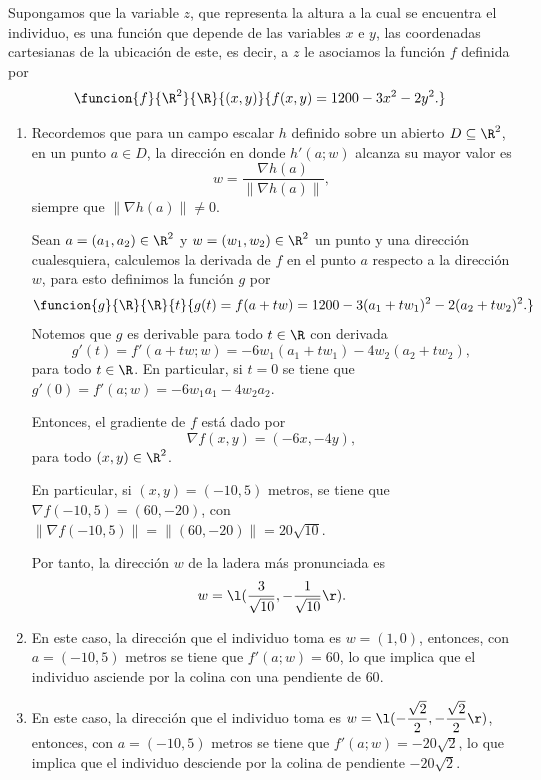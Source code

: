\documentclass[a4,11pt]{aleph-examen}
\begin{document}
\begin{preguntas}
\begin{respuesta}
\begin{respuesta}
\begin{respuesta}
    Supongamos que la variable $z$, que representa la altura a la cual se encuentra el individuo, es una función que depende de las variables $x$ e $y$, las coordenadas cartesianas de la ubicación de este, es decir, a $z$ le asociamos la función $f$ definida por
    \[
        \funcion{f}{\R^2}{\R}
        {(x, y)}{f(x, y) = 1200 - 3x^2 - 2y^2.}
    \]

    \begin{enumerate}
    \item 
        Recordemos que para un campo escalar $h$ definido sobre un abierto $D\subseteq\R^2$, en un punto $a\in D$, la dirección en donde $h'(a;w)$ alcanza su mayor valor es
        \[
            w = \frac{\nabla h(a)}{\|\nabla h(a)\|},
        \]
        siempre que $\|\nabla h(a)\|\neq 0$.

        Sean $a = (a_1, a_2)\in\R^2$ y $w = (w_1, w_2)\in\R^2$ un punto y una dirección cualesquiera, calculemos la derivada de $f$ en el punto $a$ respecto a la dirección $w$, para esto definimos la función $g$ por
        \[
            \funcion{g}{\R}{\R}
            {t}{g(t) = f(a + tw) = 1200 - 3(a_1 + tw_1)^2 - 2(a_2 + tw_2)^2.}
        \]
        Notemos que $g$ es derivable para todo $t\in\R$ con derivada
        \[
            g'(t) = f'(a + tw; w) = - 6w_1(a_1 + tw_1) - 4w_2(a_2 + tw_2),
        \]
        para todo $t\in\R$. En particular, si $t=0$ se tiene que $g'(0) = f'(a;w) = - 6w_1 a_1 - 4w_2 a_2$.

        Entonces, el gradiente de $f$ está dado por
        \[
            \nabla f(x, y) = (- 6x , - 4y),
        \]
        para todo $(x, y)\in\R^2$. 

        En particular, si $(x, y) = (-10, 5)$ metros, se tiene que $\nabla f(-10, 5) = (60 , - 20)$, con $\|\nabla f(-10, 5)\| = \|(60 , - 20)\| = 20\sqrt{10}$. 

        Por tanto, la dirección $w$ de la ladera más pronunciada es
        \[
            w = \l(\dfrac{3}{\sqrt{10}}, -\dfrac{1}{\sqrt{10}}\r).
        \]
    \item 
        En este caso, la dirección que el individuo toma es $w = (1, 0)$, entonces, con $a = (-10, 5)$ metros se tiene que $f'(a;w) = 60$, lo que implica que el individuo asciende por la colina con una pendiente de $60$.
    \item 
        En este caso, la dirección que el individuo toma es $w = \l(-\dfrac{\sqrt{2}}{2},-\dfrac{\sqrt{2}}{2}\r)$, entonces, con $a = (-10, 5)$ metros se tiene que $f'(a;w) = -20\sqrt{2}$, lo que implica que el individuo desciende por la colina de pendiente $-20\sqrt{2}$.
    \end{enumerate}
\end{respuesta}



\end{respuesta}
\end{respuesta}
\end{preguntas}
\end{document}
